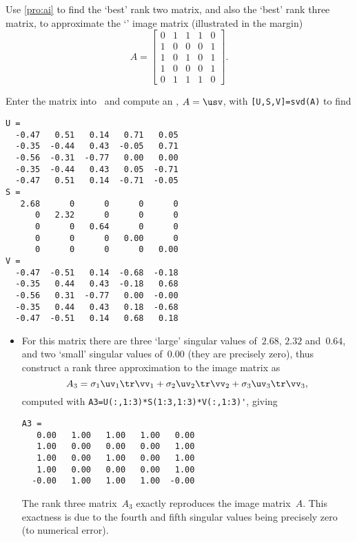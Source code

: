 \begin{example} \label{eg:bullseyemat}
Use \autoref{pro:ai} to find the `best' rank two matrix, and also the `best' rank three matrix, to approximate the `' image matrix (illustrated in the margin)
\marginpar{}
\begin{equation*}
A=\begin{bmatrix} 0&1&1&1&0
\\1&0&0&0&1
\\1&0&1&0&1
\\1&0&0&0&1
\\0&1&1&1&0 \end{bmatrix}.
\end{equation*}
\begin{solution} 
Enter the matrix into \script\ and compute an \svd, \(A=\usv\), with \verb|[U,S,V]=svd(A)| to find \twodp
\begin{verbatim}
U =
  -0.47   0.51   0.14   0.71   0.05
  -0.35  -0.44   0.43  -0.05   0.71
  -0.56  -0.31  -0.77   0.00   0.00
  -0.35  -0.44   0.43   0.05  -0.71
  -0.47   0.51   0.14  -0.71  -0.05
S =
   2.68      0      0      0      0
      0   2.32      0      0      0
      0      0   0.64      0      0
      0      0      0   0.00      0
      0      0      0      0   0.00
V =
  -0.47  -0.51   0.14  -0.68  -0.18
  -0.35   0.44   0.43  -0.18   0.68
  -0.56   0.31  -0.77   0.00  -0.00
  -0.35   0.44   0.43   0.18  -0.68
  -0.47  -0.51   0.14   0.68   0.18
\end{verbatim}
\setbox\ajrqrbox\hbox{}%
\marginpar{\usebox{\ajrqrbox\\[2ex]}}%
\begin{itemize}
\item For this matrix there are three `large' singular values of~\(2.68\), \(2.32\) and~\(0.64\), and two `small' singular values of~\(0.00\) (they are precisely zero), thus construct a rank three approximation to the image matrix as
\begin{equation*}
A_3=\sigma_1\uv_1\tr\vv_1+\sigma_2\uv_2\tr\vv_2+\sigma_3\uv_3\tr\vv_3,
\end{equation*}
computed with \verb|A3=U(:,1:3)*S(1:3,1:3)*V(:,1:3)'|, giving \twodp
\begin{verbatim}
A3 =
   0.00   1.00   1.00   1.00   0.00
   1.00   0.00   0.00   0.00   1.00
   1.00   0.00   1.00   0.00   1.00
   1.00   0.00   0.00   0.00   1.00
  -0.00   1.00   1.00   1.00  -0.00
\end{verbatim}
The rank three matrix~\(A_3\) exactly reproduces the image matrix~\(A\). 
This exactness is due to the  fourth and fifth singular values being precisely zero (to numerical error).


\end{itemize}
\end{solution}
\end{example}
